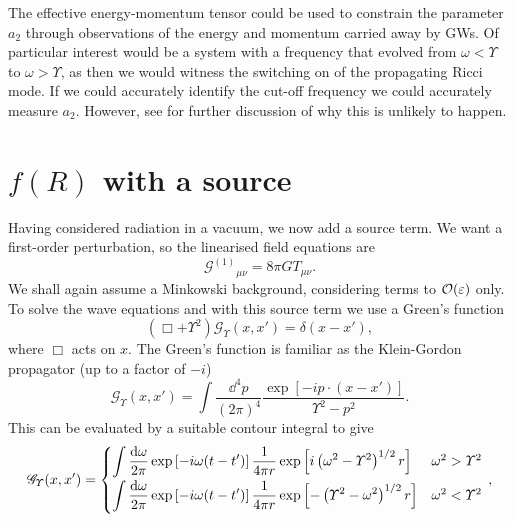 The effective energy-momentum tensor could be used to constrain the parameter $a_2$ through observations of the energy and momentum carried away by GWs. Of particular interest would be a system with a frequency that evolved from $\omega < \Upsilon$ to $\omega > \Upsilon$, as then we would witness the switching on of the propagating Ricci mode. If we could accurately identify the cut-off frequency we could accurately measure $a_2$. However, see  for further discussion of why this is unlikely to happen.

\section{$f(R)$ with a source\label{sec:Source}}

Having considered radiation in a vacuum, we now add a source term. We want a first-order perturbation, so the linearised field equations are
\begin{equation}
 {\mathcal{G}^{(1)}}_{\mu\nu} = 8\pi G T_{\mu\nu}.
\end{equation}
We shall again assume a Minkowski background, considering terms to $\mathcal{O}({\varepsilon})$ only. To solve the wave equations  and  with this source term we use a Green's function
\begin{equation}
\left(\Box + \Upsilon^2\right)\mathscr{G}_\Upsilon(x, x') = \delta(x - x'),
\end{equation}
where $\Box$ acts on $x$. The Green's function is familiar as the Klein-Gordon propagator (up to a factor of $-i$)~\cite{Peskin1995a}
\begin{equation}
\mathscr{G}_\Upsilon(x, x') = \int \frac{\dd^4 p}{(2\pi)^4} \frac{\exp\left[-ip\cdot(x-x')\right]}{\Upsilon^2 - p^2}.
\end{equation}
This can be evaluated by a suitable contour integral to give
\begin{equation}
\mathscr{G}_\Upsilon(x, x') =
\begin{cases}
{\displaystyle \int{\frac{\dd \omega}{2\pi} \exp\left[-i\omega(t-t')\right]\recip{4\pi r}\exp\left[i\left(\omega^2 - \Upsilon^2\right)^{1/2}r\right]}} & \omega^2 > \Upsilon^2\vspace{0.8mm}\\
{\displaystyle \int{\frac{\dd \omega}{2\pi} \exp\left[-i\omega(t-t')\right]\recip{4\pi r}\exp\left[-\left(\Upsilon^2 - \omega^2\right)^{1/2}r\right]}} & \omega^2 < \Upsilon^2\vspace{0.8mm}
\end{cases}\, ,
\label{eq:Green}
\end{equation}
